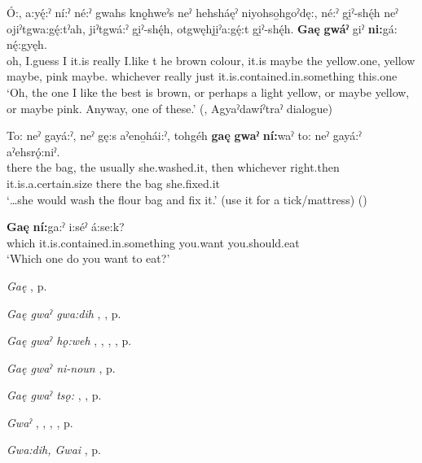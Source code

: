 \ea
\label{ex:gpart17}
\gll Ó:, a:yę́:ˀ ní:ˀ né:ˀ gwahs knǫ̱hweˀs neˀ hehsháęˀ niyohso̱hgoˀdę:, né:ˀ gi̱ˀ-shę́h neˀ ojiˀtgwa:gę́:tˀah, jiˀtgwá:ˀ gi̱ˀ-shę́h, otgwęhji̱ˀa:gę́:t gi̱ˀ-shę́h. \textbf{Gaę} \textbf{gwáˀ} giˀ \textbf{ni:}gá: nę́:gyęh.\\
oh, I.guess I it.is really I.like t he brown colour, it.is maybe the yellow.one, yellow maybe, pink maybe. whichever really just it.is.contained.in.something this.one\\
\glt ‘Oh, the one I like the best is brown, or perhaps a light yellow, or maybe yellow, or maybe pink. Anyway, one of these.’ (\cite[225]{mithun_watewayestanih_1984}, Agyaˀdawíˀtraˀ dialogue)
\z

\ea
\label{ex:gpart18}
\gll To: neˀ gayá:ˀ, neˀ gę:s aˀeno̱hái:ˀ, tohgéh \textbf{gaę} \textbf{gwaˀ} \textbf{ní:}waˀ to: neˀ gayá:ˀ aˀehsrǫ́:niˀ.\\
there the bag, the usually she.washed.it, then whichever right.then it.is.a.certain.size there the bag she.fixed.it\\
\glt ‘…she would wash the flour bag and fix it.’ (use it for a tick/mattress) (\cite{henry_de_2005})
\z

\ea
\label{ex:gpart19}
\gll \textbf{Gaę} \textbf{ní:}ga:ˀ i:séˀ á:se:k?\\
which it.is.contained.in.something you.want you.should.eat\\
\glt ‘Which one do you want to eat?’
\z

\begin{CayugaRelated}
\item \textit{Gaę} , p. \pageref{p:[gaę-]}\\
\item \textit{Gaę gwaˀ gwa:dih} , , p. \pageref{p:[gaę gwaˀ gwa:dih]}\\
\item \textit{Gaę gwaˀ hǫ:weh} , , , , p. \pageref{p:[gaę gwaˀ hǫ:weh]}\\
\item \textit{Gaę gwaˀ ni-noun} , p. \pageref{p:[gaę gwaˀ ni-noun]}\\
\item \textit{Gaę gwaˀ tsǫ:} , , p. \pageref{p:[gaę gwaˀ tsǫ:]}\\
\item \textit{Gwaˀ} , , , , p. \pageref{p:[gwaˀ] ‘immediately’}\\
\item \textit{Gwa:dih, Gwai} , p. \pageref{p:[gwa:dih]}
\end{CayugaRelated}



